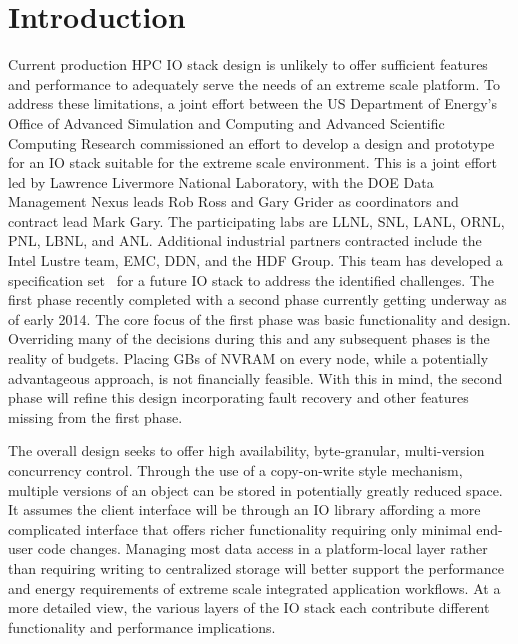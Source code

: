 \documentclass[conference]{IEEEtran}
\begin{document}


\section{Introduction}

Current production HPC IO stack design is unlikely to offer sufficient features
and performance to adequately serve the needs of an extreme scale platform. To
address these limitations, a joint effort between the US Department of Energy's
Office of Advanced Simulation and Computing and Advanced Scientific Computing
Research commissioned an effort to develop a design and prototype for an IO
stack suitable for the extreme scale environment. This is a joint effort led by
Lawrence Livermore National Laboratory, with the DOE Data Management Nexus
leads Rob Ross and Gary Grider as coordinators and contract lead Mark Gary. The
participating labs are LLNL, SNL, LANL, ORNL, PNL, LBNL, and ANL. Additional
industrial partners contracted include the Intel Lustre team, EMC, DDN, and the
HDF Group. This team has developed a specification
set~\cite{fastforward:2014:docs} for a future IO stack to address the
identified challenges. The first phase recently completed with a second phase
currently getting underway as of early 2014. The core focus of the first phase
was basic functionality and design. Overriding many of the decisions during
this and any subsequent phases is the reality of budgets. Placing GBs of NVRAM
on every node, while a potentially advantageous approach, is not financially
feasible. With this in mind, the second phase will refine this design
incorporating fault recovery and other features missing from the first phase.

The overall design seeks to offer high availability, byte-granular,
multi-version concurrency control. Through the use of a copy-on-write style
mechanism, multiple versions of an object can be stored in potentially greatly
reduced space. It assumes the client interface will be through an IO library
affording a more complicated interface that offers richer functionality
requiring only minimal end-user code changes.  Managing most data access in a
platform-local layer rather than requiring writing to centralized storage will
better support the performance and energy requirements of extreme scale
integrated application workflows. At a more detailed view, the various layers
of the IO stack each contribute different functionality and performance
implications.
\end{document}
